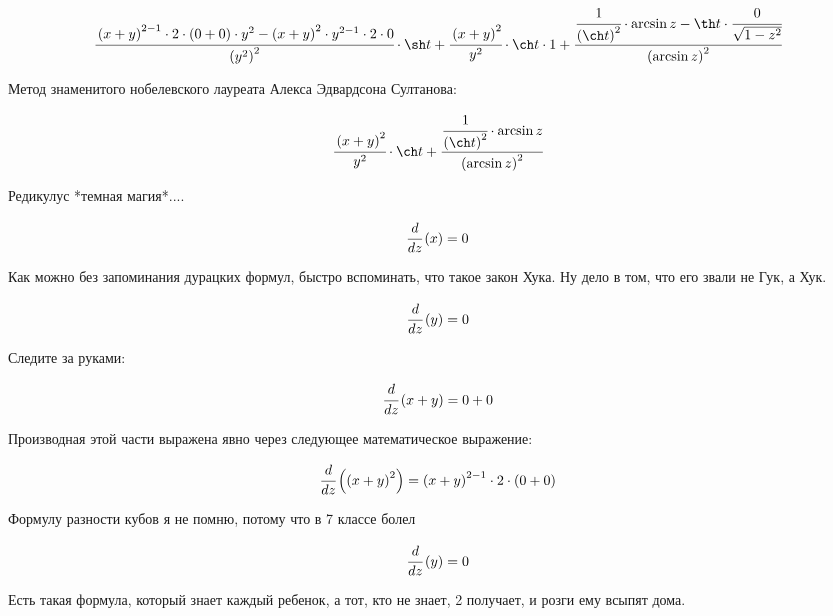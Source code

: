 \begin{dmath}
\cfrac{\left(x + y\right)^{2 - 1} \cdot 2 \cdot \left(0 + 0\right) \cdot y^{2} - \left(x + y\right)^{2} \cdot y^{2 - 1} \cdot 2 \cdot 0}{\left(y^{2}\right)^{2}} \cdot \sh t + \cfrac{\left(x + y\right)^{2}}{y^{2}} \cdot \ch t \cdot 1 + \cfrac{\cfrac{1}{\left(\ch t\right)^{2}} \cdot \arcsin z - \th t \cdot \cfrac{0}{\sqrt{  1 - z^{2}}}}{\left(\arcsin z\right)^{2}}
\end{dmath}


Метод знаменитого нобелевского лауреата Алекса Эдвардсона Султанова:


\begin{dmath}
\cfrac{\left(x + y\right)^{2}}{y^{2}} \cdot \ch t + \cfrac{\cfrac{1}{\left(\ch t\right)^{2}} \cdot \arcsin z}{\left(\arcsin z\right)^{2}}
\end{dmath}


Редикулус *темная магия*....


\begin{dmath}
 \cfrac{d}{d z} \left( x \right) = 0 
\end{dmath}


Как можно без запоминания дурацких формул, быстро вспоминать, что такое закон Хука. Ну дело в том, что его звали не Гук, а Хук.


\begin{dmath}
 \cfrac{d}{d z} \left( y \right) = 0 
\end{dmath}


Следите за руками:


\begin{dmath}
 \cfrac{d}{d z} \left( x + y \right) = 0 + 0 
\end{dmath}


Производная этой части выражена явно через следующее математическое выражение:


\begin{dmath}
 \cfrac{d}{d z} \left( \left(x + y\right)^{2} \right) = \left(x + y\right)^{2 - 1} \cdot 2 \cdot \left(0 + 0\right) 
\end{dmath}


Формулу разности кубов я не помню, потому что в 7 классе болел


\begin{dmath}
 \cfrac{d}{d z} \left( y \right) = 0 
\end{dmath}


Есть такая формула, который знает каждый ребенок, а тот, кто не знает, 2 получает, и розги ему всыпят дома.


